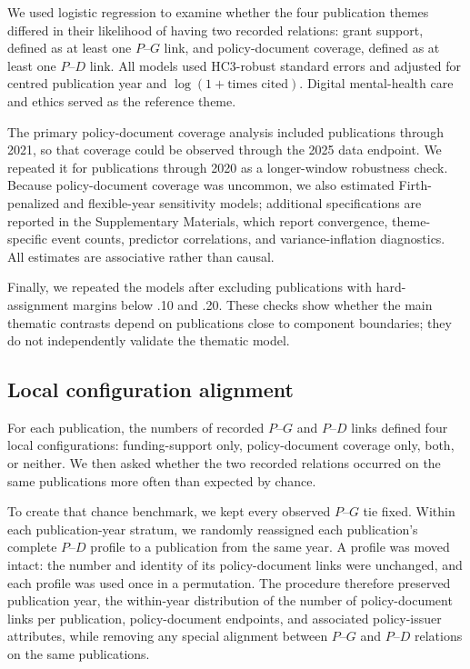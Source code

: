 \documentclass[12pt]{article}
\begin{document}
We used logistic regression to examine whether the four publication themes differed in their likelihood of having two recorded relations: grant support, defined as at least one $P$--$G$ link, and policy-document coverage, defined as at least one $P$--$D$ link. All models used HC3-robust standard errors and adjusted for centred publication year and $\log(1+\text{times cited})$. Digital mental-health care and ethics served as the reference theme.

The primary policy-document coverage analysis included publications through 2021, so that coverage could be observed through the 2025 data endpoint. We repeated it for publications through 2020 as a longer-window robustness check. Because policy-document coverage was uncommon, we also estimated Firth-penalized and flexible-year sensitivity models; additional specifications are reported in the Supplementary Materials, which report convergence, theme-specific event counts, predictor correlations, and variance-inflation diagnostics. All estimates are associative rather than causal.

Finally, we repeated the models after excluding publications with hard-assignment margins below .10 and .20. These checks show whether the main thematic contrasts depend on publications close to component boundaries; they do not independently validate the thematic model.



\subsection{Local configuration alignment}

For each publication, the numbers of recorded $P$--$G$ and $P$--$D$ links defined four local configurations: funding-support only, policy-document coverage only, both, or neither. We then asked whether the two recorded relations occurred on the same publications more often than expected by chance.

To create that chance benchmark, we kept every observed $P$--$G$ tie fixed. Within each publication-year stratum, we randomly reassigned each publication's complete $P$--$D$ profile to a publication from the same year. A profile was moved intact: the number and identity of its policy-document links were unchanged, and each profile was used once in a permutation. The procedure therefore preserved publication year, the within-year distribution of the number of policy-document links per publication, policy-document endpoints, and associated policy-issuer attributes, while removing any special alignment between $P$--$G$ and $P$--$D$ relations on the same publications.
\end{document}

